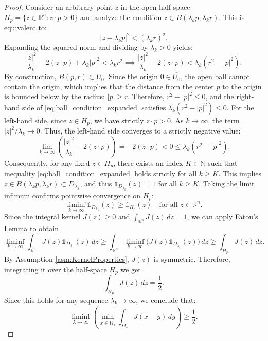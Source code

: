 \documentclass[11pt, a4paper]{article}
\theoremstyle{break}
\theoremstyle{break}
\theoremstyle{break}
\theoremstyle{break}
\theoremstyle{break}
\theoremstyle{break}
\theoremstyle{break}
\theoremstyle{break}
\theoremstyle{break}
\begin{document}
\begin{proof}
Consider an arbitrary point $z$ in the open half-space $H_p = \{ z \in \mathbb{R}^n : z \cdot p > 0 \}$ and analyze the condition $z \in B(\lambda_k p, \lambda_k r)$. This is equivalent to:
\begin{equation} \label{eq:ball_condition}
    |z - \lambda_k p|^2 < (\lambda_k r)^2.
\end{equation}
Expanding the squared norm and dividing by $\lambda_k > 0$ yields:
\begin{equation} \label{eq:ball_condition_expanded}
    \frac{|z|^2}{\lambda_k} - 2(z \cdot p) + \lambda_k |p|^2 < \lambda_k r^2 \implies \frac{|z|^2}{\lambda_k} - 2(z \cdot p) < \lambda_k (r^2 - |p|^2).
\end{equation}
By construction, $B(p, r) \subset U_0$. Since the origin $0 \in \overline{U_0}$, the open ball cannot contain the origin, which implies that the distance from the center $p$ to the origin is bounded below by the radius: $|p| \geq r$. Therefore, $r^2 - |p|^2 \leq 0$, and the right-hand side of \eqref{eq:ball_condition_expanded} satisfies $\lambda_k (r^2 - |p|^2) \leq 0$. For the left-hand side, since $z \in H_p$, we have strictly $z \cdot p > 0$. As $k \to \infty$, the term $|z|^2 / \lambda_k \to 0$. Thus, the left-hand side converges to a strictly negative value:
\begin{equation}
    \lim_{k \to \infty} \left( \frac{|z|^2}{\lambda_k} - 2(z \cdot p) \right) = -2(z \cdot p) < 0 \leq \lambda_k (r^2 - |p|^2).
\end{equation}
Consequently, for any fixed $z \in H_p$, there exists an index $K \in \mathbb{N}$ such that inequality \eqref{eq:ball_condition_expanded} holds strictly for all $k \geq K$. This implies $z \in B(\lambda_k p, \lambda_k r) \subset D_{\lambda_k}$, and thus $\mathds{1}_{D_{\lambda_k}}(z) = 1$ for all $k \geq K$. Taking the limit infimum confirms pointwise convergence on $H_p$:
\begin{equation}
    \liminf_{k \to \infty} \mathds{1}_{D_{\lambda_k}}(z) \geq \mathds{1}_{H_p}(z) \quad \text{for all } z \in \mathbb{R}^n.
\end{equation}
Since the integral kernel $J(z) \geq 0$ and $\int_{\mathbb{R}^n} J(z) \, dz = 1$, we can apply Fatou's Lemma to obtain
\begin{equation}
    \liminf_{k \to \infty} \int_{\mathbb{R}^n} J(z) \mathds{1}_{D_{\lambda_k}}(z) \, dz \geq \int_{\mathbb{R}^n} \liminf_{k \to \infty} \big( J(z) \mathds{1}_{D_{\lambda_k}}(z) \big) \, dz \geq \int_{H_p} J(z) \, dz.
\end{equation}
By Assumption \ref{asm:KernelProperties}, $J(z)$ is symmetric. Therefore, integrating it over the half-space $H_p$ we get
\begin{equation}
    \int_{H_p} J(z) \, dz = \frac{1}{2}.
\end{equation}
Since this holds for any sequence $\lambda_k \to \infty$, we conclude that:
\begin{equation}
    \liminf_{\lambda \to \infty} \left( \min_{x \in \overline{\Omega_\lambda}} \int_{\Omega_\lambda} J(x-y) \, dy \right) \geq \frac{1}{2}.
\end{equation}
\end{proof}
\end{document}
